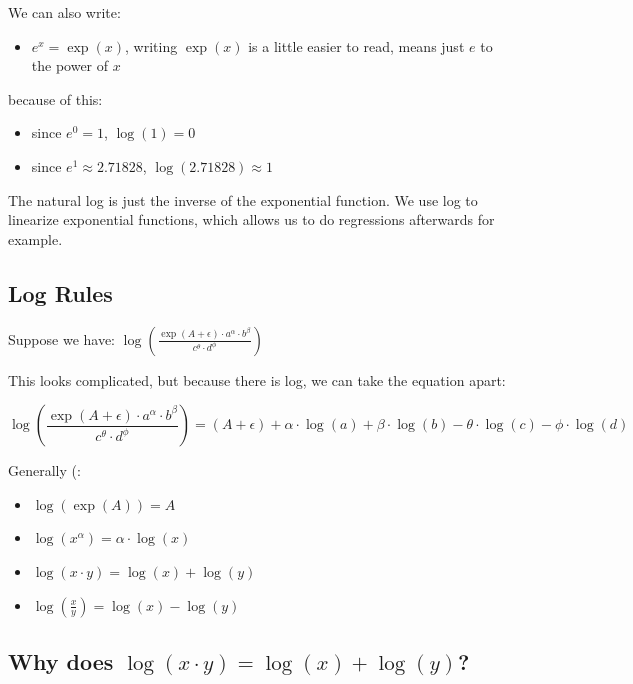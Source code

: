 \documentclass[
]{book}
\providecommand{\tightlist}{%
  \setlength{\itemsep}{0pt}\setlength{\parskip}{0pt}}
\begin{document}
We can also write:

\begin{itemize}
\tightlist
\item
  \(e^x =\exp (x)\), writing \(\exp (x)\) is a little easier to read,
  means just \(e\) to the power of \(x\)
\end{itemize}

because of this:

\begin{itemize}
\item
  since \(e^0 =1\), \(\log (1)=0\)
\item
  since \(e^1 \approx 2.71828\), \(\log (2.71828)\approx 1\)
\end{itemize}

The natural log is just the inverse of the exponential function. We use
log to linearize exponential functions, which allows us to do
regressions afterwards for example.

\hypertarget{log-rules}{%
\subsection{Log Rules}\label{log-rules}}

Suppose we have:
\(\log \left(\frac{\exp (A+\epsilon )\cdot a^{\alpha } \cdot b^{\beta } }{c^{\theta } \cdot d^{\phi } }\right)\)

This looks complicated, but because there is log, we can take the
equation apart:

\[\log \left(\frac{\exp (A+\epsilon )\cdot a^{\alpha } \cdot b^{\beta } }{c^{\theta } \cdot d^{\phi } }\right)=(A+\epsilon )+\alpha \cdot \log (a)+\beta \cdot \log (b)-\theta \cdot \log (c)-\phi \cdot \log (d)\]

Generally (:

\begin{itemize}
\item
  \(\displaystyle \log (\exp (A))=A\)
\item
  \(\displaystyle \log (x^{\alpha } )=\alpha \cdot \log (x)\)
\item
  \(\displaystyle \log (x\cdot y)=\log (x)+\log (y)\)
\item
  \(\displaystyle \log (\frac{x}{y})=\log (x)-\log (y)\)
\end{itemize}

\hypertarget{why-does-log-xcdot-ylog-xlog-y}{%
\subsection{\texorpdfstring{Why does \(\log (x\cdot y)=\log (x)+\log (y)\)?}{Why does \textbackslash log (x\textbackslash cdot y)=\textbackslash log (x)+\textbackslash log (y)?}}\label{why-does-log-xcdot-ylog-xlog-y}}
\end{document}

